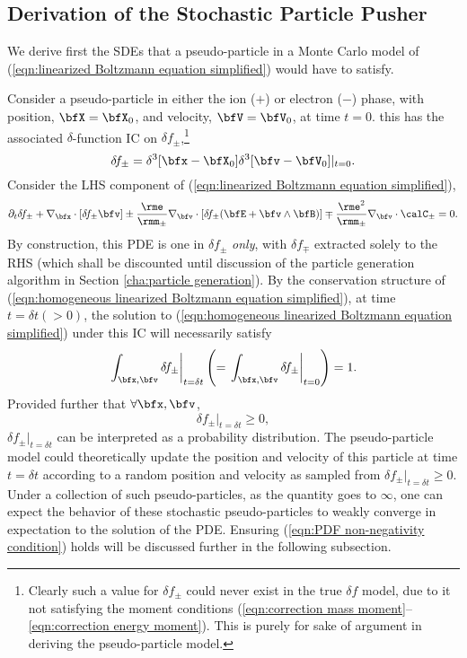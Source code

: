 \subsection*{Derivation of the Stochastic Particle Pusher}
    We derive first the SDEs that a pseudo-particle in a Monte Carlo model of (\ref{eqn:linearized Boltzmann equation simplified}) would have to satisfy.

    Consider a pseudo-particle in either the ion ($+$) or electron ($-$) phase, with position, $\bfX  =  \bfX_{0}$, and velocity, $\bfV  =  \bfV_{0}$, at time $t  =  0$. this has the associated $\delta$-function IC on $\delta\!f_{\pm}$,\footnote{Clearly such a value for $\delta\!f_{\pm}$ could never exist in the true $\delta\!f$ model, due to it not satisfying the moment conditions (\ref{eqn:correction mass moment}--\ref{eqn:correction energy moment}). This is purely for sake of argument in deriving the pseudo-particle model.}
    \begin{equation}
        \delta\!f_{\pm}  =  \delta^{3}[\bfx - \bfX_{0}]\delta^{3}[\bfv - \bfV_{0}]|_{t = 0}.
    \end{equation}
    Consider the LHS component of (\ref{eqn:linearized Boltzmann equation simplified}),
    \begin{equation}\label{eqn:homogeneous linearized Boltzmann equation simplified}
        \partial_{t}\delta\!f_{\pm} + \nabla_{\bfx}\cdot[\delta\!f_{\pm}\bfv] \pm \frac{\rme}{\rmm_{\pm}}\nabla_{\bfv}\cdot[\delta\!f_{\pm}(\bfE + \bfv\wedge\bfB)] \mp \frac{\rme^{2}}{\rmm_{\pm}}\nabla_{\bfv}\cdot\calC_{\pm}  =  0.
    \end{equation}
    By construction, this PDE is one in $\delta\!f_{\pm}$ \emph{only}, with $\delta\!f_{\mp}$ extracted solely to the RHS (which shall be discounted until discussion of the particle generation algorithm in Section \ref{cha:particle generation}). By the conservation structure of (\ref{eqn:homogeneous linearized Boltzmann equation simplified}), at time $t = \delta t (> 0)$, the solution to (\ref{eqn:homogeneous linearized Boltzmann equation simplified}) under this IC will necessarily satisfy
    \begin{equation}
        \left.\int_{\bfx, \bfv}\delta\!f_{\pm}\right|_{t = \delta t}  \left(=  \left.\int_{\bfx, \bfv}\delta\!f_{\pm}\right|_{t = 0}\right)  =  1.
    \end{equation}
    Provided further that $\forall \bfx, \bfv$,
    \begin{equation}\label{eqn:PDF non-negativity condition}
        \delta\!f_{\pm}|_{t = \delta t}  \geq  0,
    \end{equation}
    $\delta\!f_{\pm}|_{t = \delta t}$ can be interpreted as a probability distribution. The pseudo-particle model could theoretically update the position and velocity of this particle at time $t  =  \delta t$ according to a random position and velocity as sampled from $\delta\!f_{\pm}|_{t = \delta t}  \geq  0$. Under a collection of such pseudo-particles, as the quantity goes to $\infty$, one can expect the behavior of these stochastic pseudo-particles to weakly converge in expectation to the solution of the PDE. Ensuring (\ref{eqn:PDF non-negativity condition}) holds will be discussed further in the following subsection.

